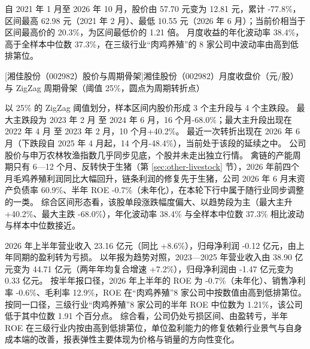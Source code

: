  自 2021 年 1 月至 2026 年 10 月，股价由 57.70 元变为 12.81 元，累计 -77.8\%，区间最高 62.98 元（2021 年 2 月）、最低 10.55 元（2026 年 6 月）；当前价相当于区间最高价的 20.3\%，为区间最低价的 1.21 倍。 月度收益的年化波动率 38.4\%，高于全样本中位数 37.3\%，在三级行业“肉鸡养殖”的 8 家公司中波动率由高到低排第位。

\begin{center}
\begin{minipage}{\textwidth}\centering
{}

[湘佳股份（002982）股价与周期骨架]{湘佳股份（002982）月度收盘价（元/股）与 ZigZag 周期骨架（阈值 25\%，圆点为周期转折点）}
\end{minipage}
\end{center}

 以 25\% 的 ZigZag 阈值划分，样本区间内股价形成 3 个主升段与 4 个主跌段。 最大主跌段为 2023 年 2 月 至 2024 年 6 月，16 个月-68.0\%；最大主升段出现在 2022 年 4 月 至 2023 年 2 月，10 个月+40.2\%。 最近一次转折出现在 2026 年 6 月（下跌段自 2025 年 4 月起，14 个月-48.4\%），当前处于该段的延续之中。 公司股价与申万农林牧渔指数几乎同步见底，个股并未走出独立行情。 禽链的产能周期只有 6---12 个月、反转快于生猪（第 \ref{sec:other-livestock} 节），2026 年前四个月毛鸡养殖利润同比大幅回升，链条利润的修复先于生猪，公司 2026 年 6 月末资产负债率 60.9\%、半年 ROE -0.7\%（未年化），在本轮下行中属于随行业同步调整的一类。 综合区间形态看，该股单段涨跌幅度偏大、以趋势段为主（最大主升 +40.2\%、最大主跌 -68.0\%），年化波动率 38.4\% 与全样本中位数 37.3\% 相比波动与样本中位数接近。

 2026 年上半年营业收入 23.16 亿元（同比 +8.6\%），归母净利润 -0.12 亿元，由上年同期的盈利转为亏损。 以年报为趋势对照，2023---2025 年营业收入由 38.90 亿元变为 44.71 亿元（两年年均复合增速 +7.2\%），归母净利润由 -1.47 亿元变为 0.33 亿元。 按半年报口径，2026 年上半年的 ROE 为 -0.7\%（未年化）、销售净利率 -0.6\%、毛利率 12.9\%，ROE 在“肉鸡养殖”8 家公司中按数值由高到低排第位。 按同一口径，三级行业“肉鸡养殖”8 家公司的半年 ROE 中位数为 1.21\%，该公司低于其中位数 1.91 个百分点。 综合看，公司仍处亏损区间、由盈转亏，半年 ROE 在三级行业内按由高到低排第位，单位盈利能力的修复依赖行业景气与自身成本端的改善，报表弹性主要体现为价格与销量的方向性变化。

